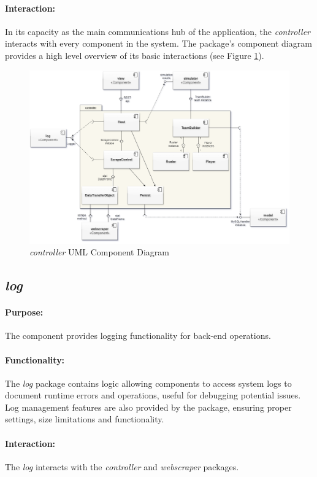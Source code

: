 \documentclass{thesis-ekf}
\theoremstyle{definition}
\theoremstyle{remark}
\begin{document}
\paragraph{Interaction:}
In its capacity as the main communications hub of the application, the \emph{controller} interacts with every component in the system. The package's component diagram provides a high level overview of its basic interactions (see Figure {\ref{img-controller-component}}).
\begin{figure}[th!]
	\centering
	\includegraphics[width=1\linewidth]{img/component/component_controller}
	\caption{\emph{controller} UML Component Diagram}
	\label{img-controller-component}
\end{figure}

\subsection{\emph{log}}
\paragraph{Purpose:}
The component provides logging functionality for back-end operations.
\paragraph{Functionality:}
The \emph{log} package contains logic allowing components to access system logs to document runtime errors and operations, useful for debugging potential issues. Log management features are also provided by the package, ensuring proper settings, size limitations and functionality.
\paragraph{Interaction:}
The \emph{log} interacts with the \emph{controller} and \emph{webscraper} packages.
\end{document}
